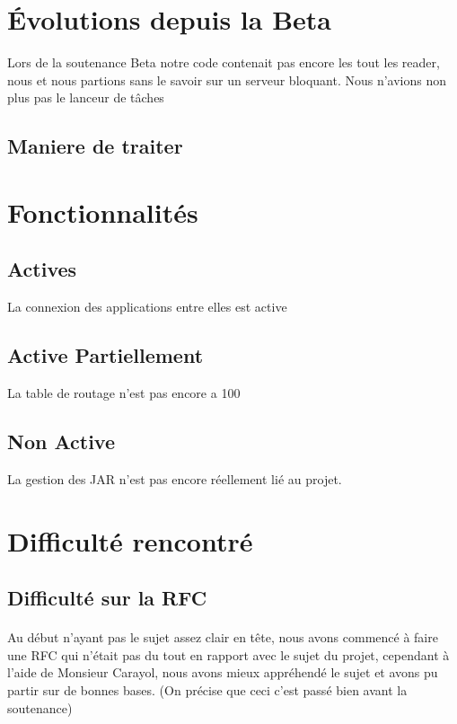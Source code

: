 \documentclass[a4paper,titlepage]{report}
\begin{document}
\pagebreak
\section{Évolutions depuis la Beta}
Lors de la soutenance Beta notre code contenait pas encore les tout les reader, nous et nous partions sans le savoir sur un serveur bloquant.
Nous n'avions non plus pas le lanceur de tâches 
\subsection{Maniere de traiter}






\section{Fonctionnalités}
\subsection{Actives}
La connexion des applications entre elles est active
\subsection{Active Partiellement}
La table de routage n'est pas encore a 100%
\subsection{Non Active}
La gestion des JAR n'est pas encore réellement lié au projet.






\pagebreak
\section{Difficulté rencontré}
\subsection{Difficulté sur la RFC}
\paragraph{}
Au début n'ayant pas le sujet assez clair en tête, nous avons commencé à faire une RFC qui n'était pas du tout en rapport avec le sujet du projet, cependant à l'aide de Monsieur Carayol, nous avons mieux appréhendé le sujet et avons pu partir sur de bonnes bases. (On précise que ceci c'est passé bien avant la soutenance)
\end{document}
